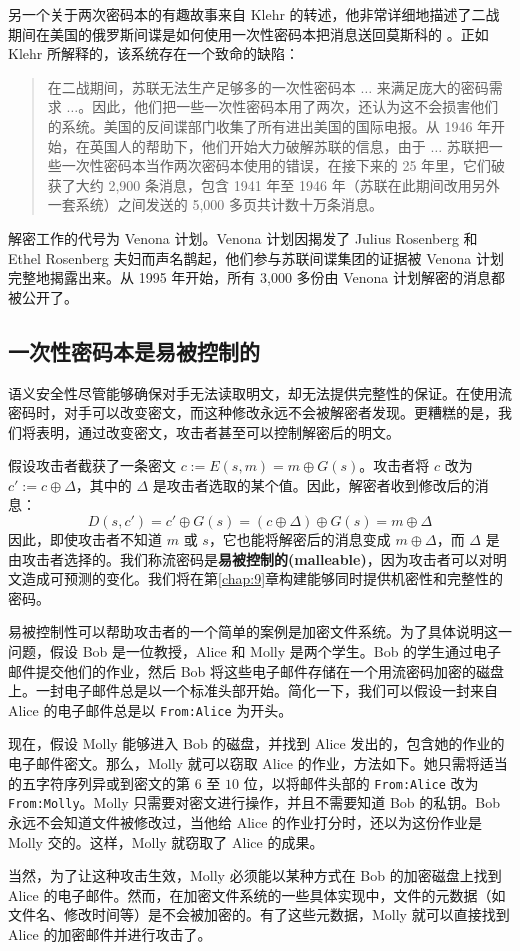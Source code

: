 另一个关于两次密码本的有趣故事来自 Klehr 的转述，他非常详细地描述了二战期间在美国的俄罗斯间谍是如何使用一次性密码本把消息送回莫斯科的 \cite{haynes1999venona}。正如 Klehr 所解释的，该系统存在一个致命的缺陷：
\begin{quote}
在二战期间，苏联无法生产足够多的一次性密码本 $\dots$ 来满足庞大的密码需求 $\dots$。因此，他们把一些一次性密码本用了两次，还认为这不会损害他们的系统。美国的反间谍部门收集了所有进出美国的国际电报。从 1946 年开始，在英国人的帮助下，他们开始大力破解苏联的信息，由于 $\dots$ 苏联把一些一次性密码本当作两次密码本使用的错误，在接下来的 25 年里，它们破获了大约 2,900 条消息，包含 1941 年至 1946 年（苏联在此期间改用另外一套系统）之间发送的 5,000 多页共计数十万条消息。
\end{quote}
解密工作的代号为 Venona 计划。Venona 计划因揭发了 Julius Rosenberg 和 Ethel Rosenberg 夫妇而声名鹊起，他们参与苏联间谍集团的证据被 Venona 计划完整地揭露出来。从 1995 年开始，所有 3,000 多份由 Venona 计划解密的消息都被公开了。

\subsection{一次性密码本是易被控制的}\label{subsec:3-3-2}

语义安全性尽管能够确保对手无法读取明文，却无法提供完整性的保证。在使用流密码时，对手可以改变密文，而这种修改永远不会被解密者发现。更糟糕的是，我们将表明，通过改变密文，攻击者甚至可以控制解密后的明文。

假设攻击者截获了一条密文 $c:=E(s,m)=m\oplus G(s)$。攻击者将 $c$ 改为 $c':=c\oplus\Delta$，其中的 $\Delta$ 是攻击者选取的某个值。因此，解密者收到修改后的消息：
\[
D(s,c')
=c'\oplus G(s)
=(c\oplus\Delta)\oplus G(s)
=m\oplus\Delta
\]
因此，即使攻击者不知道 $m$ 或 $s$，它也能将解密后的消息变成 $m\oplus\Delta$，而 $\Delta$ 是由攻击者选择的。我们称流密码是\textbf{易被控制的(malleable)}，因为攻击者可以对明文造成可预测的变化。我们将在第\ref{chap:9}章构建能够同时提供机密性和完整性的密码。

易被控制性可以帮助攻击者的一个简单的案例是加密文件系统。为了具体说明这一问题，假设 Bob 是一位教授，Alice 和 Molly 是两个学生。Bob 的学生通过电子邮件提交他们的作业，然后 Bob 将这些电子邮件存储在一个用流密码加密的磁盘上。一封电子邮件总是以一个标准头部开始。简化一下，我们可以假设一封来自 Alice 的电子邮件总是以 \texttt{From:Alice} 为开头。

现在，假设 Molly 能够进入 Bob 的磁盘，并找到 Alice 发出的，包含她的作业的电子邮件密文。那么，Molly 就可以窃取 Alice 的作业，方法如下。她只需将适当的五字符序列异或到密文的第 $6$ 至 $10$ 位，以将邮件头部的 \texttt{From:Alice} 改为 \texttt{From:Molly}。Molly 只需要对密文进行操作，并且不需要知道 Bob 的私钥。Bob 永远不会知道文件被修改过，当他给 Alice 的作业打分时，还以为这份作业是 Molly 交的。这样，Molly 就窃取了 Alice 的成果。

当然，为了让这种攻击生效，Molly 必须能以某种方式在 Bob 的加密磁盘上找到 Alice 的电子邮件。然而，在加密文件系统的一些具体实现中，文件的元数据（如文件名、修改时间等）是不会被加密的。有了这些元数据，Molly 就可以直接找到 Alice 的加密邮件并进行攻击了。